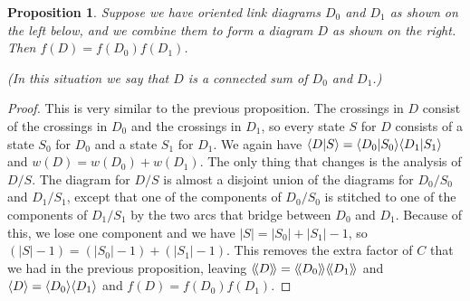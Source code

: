 \documentclass[reqno]{amsart}
\newtheorem{proposition}[theorem]{Proposition}
\theoremstyle{definition}
\begin{document}
\begin{proposition}
 Suppose we have oriented link diagrams $D_0$ and $D_1$ as shown on
 the left below, and we combine them to form a diagram $D$ as shown on
 the right.  Then $f(D)=f(D_0)f(D_1)$.
 \begin{center}
 \end{center} 
 (In this situation we say that $D$ is a \emph{connected sum} of $D_0$
 and $D_1$.)
\end{proposition}
\begin{proof}
 This is very similar to the previous proposition.  The crossings in
 $D$ consist of the crossings in $D_0$ and the crossings in $D_1$, so
 every state $S$ for $D$ consists of a state $S_0$ for $D_0$ and a
 state $S_1$ for $D_1$.  We again have
 $\langle D|S\rangle=\langle D_0|S_0\rangle\langle D_1|S_1\rangle$ and $w(D)=w(D_0)+w(D_1)$.  The
 only thing that changes is the analysis of $D/S$.  The diagram for
 $D/S$ is almost a disjoint union of the diagrams for $D_0/S_0$ and
 $D_1/S_1$, except that one of the components of $D_0/S_0$ is stitched
 to one of the components of $D_1/S_1$ by the two arcs that bridge
 between $D_0$ and $D_1$.  Because of this, we lose one component and
 we have $|S|=|S_0|+|S_1|-1$, so $(|S|-1)=(|S_0|-1)+(|S_1|-1)$.  This
 removes the extra factor of $C$ that we had in the previous
 proposition, leaving $\langle\!\langle D\rangle\!\rangle=\langle\!\langle D_0\rangle\!\rangle\langle\!\langle D_1\rangle\!\rangle$ and
 $\langle D\rangle=\langle D_0\rangle\langle D_1\rangle$ and $f(D)=f(D_0)f(D_1)$.
\end{proof}
\end{document}

